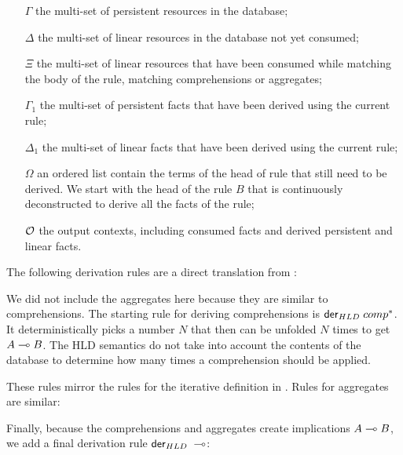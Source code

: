 \begin{enumerate}

   \item[$\Gamma$] the multi-set of persistent resources in the database;

   \item[$\Delta$] the multi-set of linear resources in the database not yet
   consumed;

   \item[$\Xi$] the multi-set of linear resources that have been consumed while
   matching the body of the rule, matching comprehensions or aggregates;

   \item[$\Gamma_1$] the multi-set of persistent facts that have been derived
   using the current rule;

   \item[$\Delta_1$] the multi-set of linear facts that have been derived using
   the current rule;

   \item[$\Omega$] an ordered list contain the terms of the head of rule that
   still need to be derived. We start with the head of the rule $B$ that is
   continuously deconstructed to derive all the facts of the rule;

   \item[$\mathcal{O}$] the output contexts, including consumed facts and derived
   persistent and linear facts.

\end{enumerate}

The following derivation rules are a direct translation from \fragment:



We did not include the aggregates here because they are similar to comprehensions.
The starting rule for deriving comprehensions is $\mathsf{der}_{HLD} \; comp^*$. It
deterministically picks a number $N$ that then can be unfolded $N$ times to get
$A \multimap B$. The HLD semantics do not take into account the contents of the
database to determine how many times a comprehension should be applied.



These rules mirror the rules for the iterative definition in \fragment.  Rules
for aggregates are similar:



Finally, because the comprehensions and aggregates create implications $A \multimap
B$, we add a final derivation rule $\mathsf{der}_{HLD} \; \multimap$:


